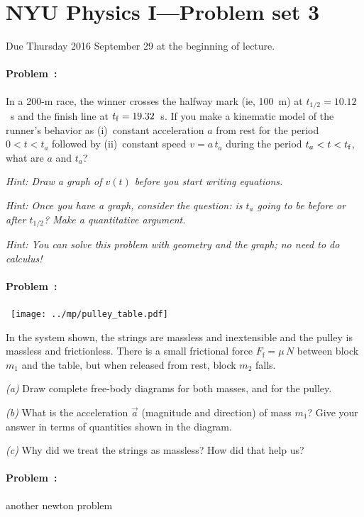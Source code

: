 \documentclass[12pt]{article}
\begin{document}
\thispagestyle{empty}

\section*{NYU Physics I---Problem set 3}

Due Thursday 2016 September 29 at the beginning of lecture.

\paragraph{Problem~\theproblem:}%
In a 200-m race, the winner crosses the halfway mark (ie, 100~m) at
$t_{1/2}=10.12$~s and the finish line at $t_{\rm f}=19.32$~s.  If you
make a kinematic model of the runner's behavior as (i)~constant
acceleration $a$ from rest for the period $0<t<t_a$ followed by
(ii)~constant speed $v=a\,t_a$ during the period $t_a<t<t_{\rm f}$,
what are $a$ and $t_a$?

\emph{Hint: Draw a graph of $v(t)$ before you start writing equations.}

\emph{Hint: Once you have a graph, consider the question: is $t_a$
going to be before or after $t_{1/2}$?  Make a quantitative argument.}

\emph{Hint: You can solve this problem with geometry and the graph; no
  need to do calculus!}

\paragraph{Problem~\theproblem:}%
\noindent~\hfill\texttt{[image: ../mp/pulley\_table.pdf]}\hfill~

In the system shown, the strings are massless and inextensible and the
pulley is massless and frictionless.  There is a small frictional
force $F_\mathrm{f}=\mu\,N$ between block $m_1$ and the table, but
when released from rest, block $m_2$ falls.

\textsl{(a)} Draw complete free-body diagrams for both masses, and for
the pulley.

\textsl{(b)} What is the acceleration $\vec{a}$ (magnitude and
direction) of mass $m_1$?  Give your answer in terms of quantities
shown in the diagram.

\textsl{(c)} Why did we treat the strings as massless? How did that
help us?

\paragraph{Problem~\theproblem:}%
another newton problem
\end{document}

